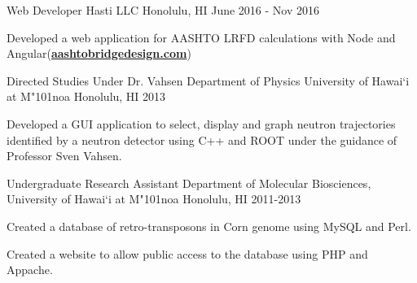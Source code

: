 \begin{cventries}
    \cventry
    {Web Developer}
    {Hasti LLC}
    {Honolulu, HI}
    {June 2016 - Nov 2016}
    {
        \begin{cvitems}
            \item {Developed a web application for AASHTO LRFD calculations with Node and Angular(\textbf{\href{http://www.aashtobridgedesign.com}{aashtobridgedesign.com}})}
        \end{cvitems}
    }
	
	\cventry
	{Directed Studies Under Dr. Vahsen}
	{Department of Physics University of Hawai`i at M{\char"101}noa}
	{Honolulu, HI}
	{2013}
	{
		\begin{cvitems}
			\item {Developed a GUI application to select, display and graph neutron trajectories identified by a neutron detector using C++ and
				ROOT under the guidance of Professor Sven Vahsen.}
		\end{cvitems}
	}

	\cventry
	{Undergraduate Research Assistant}
	{Department of Molecular Biosciences, University of Hawai`i at M{\char"101}noa}
	{Honolulu, HI}
	{2011-2013}
	{
		\begin{cvitems}
			\item {Created a database of retro-transposons in Corn genome using MySQL and Perl.}
			\item {Created a website to allow public access to the database using PHP and Appache.}
		\end{cvitems}
	}

\end{cventries}


